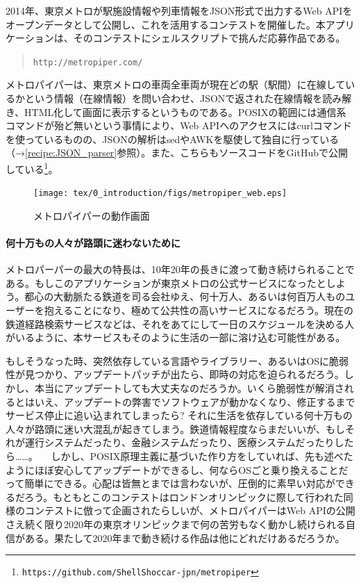 2014年、東京メトロが駅施設情報や列車情報をJSON形式で出力するWeb APIをオープンデータとして公開し、これを活用するコンテストを開催した。本アプリケーションは、そのコンテストにシェルスクリプトで挑んだ応募作品である。
\begin{quotation}
\verb|http://metropiper.com/|
\end{quotation}

メトロパイパーは、東京メトロの車両全車両が現在どの駅（駅間）に在線しているかという情報（在線情報）を問い合わせ、JSONで返された在線情報を読み解き、HTML化して画面に表示するというものである。POSIXの範囲には通信系コマンドが殆ど無いという事情により、Web APIへのアクセスにはcurlコマンドを使っているものの、JSONの解析はsedやAWKを駆使して独自に行っている（→\ref{recipe:JSON_parser}参照）。また、こちらもソースコードをGitHubで公開している\footnote{\verb|https://github.com/ShellShoccar-jpn/metropiper|}。

\begin{figure}[htb]
	\begin{center}
		\vspace{10mm}
		\texttt{[image: tex/0\_introduction/figs/metropiper\_web.eps]}
		\vspace{0mm}
		\caption{メトロパイパーの動作画面}
		\label{fig:metropiper_web}
		\vspace{0mm}
	\end{center}
\end{figure}

\paragraph{何十万もの人々が路頭に迷わないために}

メトロパーパーの最大の特長は、10年20年の長きに渡って動き続けられることである。もしこのアプリケーションが東京メトロの公式サービスになったとしよう。都心の大動脈たる鉄道を司る会社ゆえ、何十万人、あるいは何百万人ものユーザーを抱えることになり、極めて公共性の高いサービスになるだろう。現在の鉄道経路検索サービスなどは、それをあてにして一日のスケジュールを決める人がいるように、本サービスもそのように生活の一部に溶け込む可能性がある。

もしそうなった時、突然依存している言語やライブラリー、あるいはOSに脆弱性が見つかり、アップデートパッチが出たら、即時の対応を迫られるだろう。しかし、本当にアップデートしても大丈夫なのだろうか。いくら脆弱性が解消されるとはいえ、アップデートの弊害でソフトウェアが動かなくなり、修正するまでサービス停止に追い込まれてしまったら? それに生活を依存している何十万もの人々が路頭に迷い大混乱が起きてしまう。鉄道情報程度ならまだいいが、もしそれが運行システムだったり、金融システムだったり、医療システムだったりしたら……。
　しかし、POSIX原理主義に基づいた作り方をしていれば、先も述べたようにほぼ安心してアップデートができるし、何ならOSごと乗り換えることだって簡単にできる。心配は皆無とまでは言わないが、圧倒的に素早い対応ができるだろう。もともとこのコンテストはロンドンオリンピックに際して行われた同様のコンテストに倣って企画されたらしいが、メトロパイパーはWeb APIの公開さえ続く限り2020年の東京オリンピックまで何の苦労もなく動かし続けられる自信がある。果たして2020年まで動き続ける作品は他にどれだけあるだろうか。

